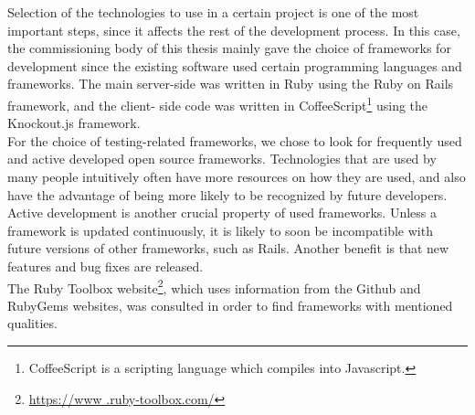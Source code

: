 
Selection of the technologies to use in a certain project is one of the
most important steps, since it affects the rest of the development
process. In this case, the commissioning body of this thesis mainly gave
the choice of frameworks for development since the existing software
used certain programming languages and frameworks. The main server-side
was written in Ruby using the Ruby on Rails framework, and the client-
side code was written in CoffeeScript\footnote{CoffeeScript is a
scripting language which compiles into Javascript.} using the
Knockout.js framework.\\

For the choice of testing-related frameworks, we chose to look for
frequently used and active developed open source frameworks.
Technologies that are used by many people intuitively often have more
resources on how they are used, and also have the advantage of being
more likely to be recognized by future developers.\\

Active development is another crucial property of used frameworks.
Unless a framework is updated continuously, it is likely to soon be
incompatible with future versions of other frameworks, such as Rails.
Another benefit is that new features and bug fixes are released.\\

The Ruby Toolbox website\footnote{\url{https://www .ruby-toolbox.com/}},
which uses information from the Github and RubyGems websites, was
consulted in order to find frameworks with mentioned qualities.\\
